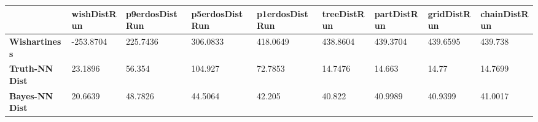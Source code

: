 \begin{tabular}{|l|l|l|l|l|l|l|l|l|}
\hline
&\textbf{wishDistRun}&\textbf{p9erdosDistRun}&\textbf{p5erdosDistRun}&\textbf{p1erdosDistRun}&\textbf{treeDistRun}&\textbf{partDistRun}&\textbf{gridDistRun}&\textbf{chainDistRun}\\\hline
\textbf{Wishartiness}&-253.8704&225.7436&306.0833&418.0649&438.8604&439.3704&439.6595&439.738\\\hline
\textbf{Truth-NN Dist}&23.1896&56.354&104.927&72.7853&14.7476&14.663&14.77&14.7699\\\hline
\textbf{Bayes-NN Dist}&20.6639&48.7826&44.5064&42.205&40.822&40.9989&40.9399&41.0017\\\hline
\end{tabular}
